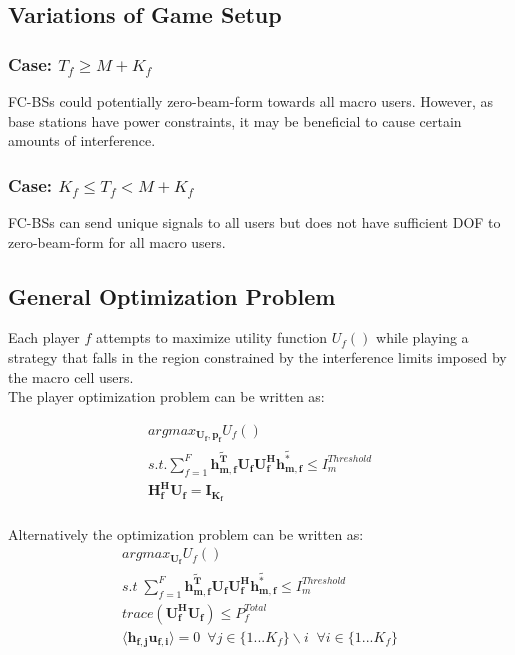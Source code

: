 \documentclass[12pt]{article}
\begin{document}
\subsection{Variations of Game Setup}

\subsubsection{Case: $T_f \geq M + K_f$}
FC-BSs could potentially zero-beam-form towards all macro users. However, as base stations have power constraints, it may be beneficial to cause certain amounts of interference. 

\subsubsection{Case: $K_f \leq T_f < M + K_f$}
FC-BSs can send unique signals to all users but does not have sufficient DOF to zero-beam-form for all macro users.


\subsection{General Optimization Problem}

Each player $f$ attempts to maximize utility function $U_f()$ while playing a strategy that falls in the region constrained by the interference limits imposed by the macro cell users.
\\

The player optimization problem can be written as:

\begin{gather*} 
argmax_{\mathbf{U_f,\mathbf{p}_f}} U_f() 
\\
s.t. \sum^F_{f=1} \mathbf{\tilde{h_{m,f}^T}}  \mathbf{U_f}  \mathbf{U_f^H} \mathbf{\tilde{h_{m,f}^*}} \leq I^{Threshold}_{m}
\\
\mathbf{H_f^H}\mathbf{U_f} = \mathbf{I_{K_f}}
\end{gather*}
\\

Alternatively the optimization problem can be written as:
\\

\begin{gather} 
argmax_{\mathbf{U_f}} U_f()\label{utility}
\\
s.t \; \sum^F_{f=1} \mathbf{\tilde{h_{m,f}^T}}  \mathbf{U_f}  \mathbf{U_f^H} \mathbf{\tilde{h_{m,f}^*}} \leq I^{Threshold}_{m} \label{interference_contstraint}
\\
trace(\mathbf{U_f^H}\mathbf{U_f}) \leq P^{Total}_{f} \label{power_constraint}
\\
\langle \mathbf{h_{f,j}}\mathbf{u_{f,i}} \rangle =0\ \; \forall j \in \{1 ... K_f\}\backslash i \;\; \forall i \in \{1 ... K_f\} \label{Zero_Forcing}
\end{gather}
\\
\end{document}
